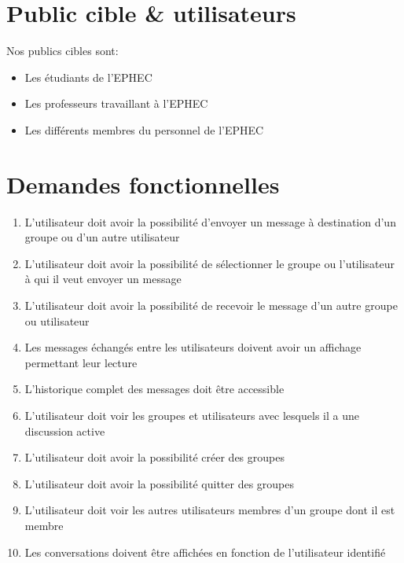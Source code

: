 \documentclass[12pt]{article}
\begin{document}
\section{Public cible \& utilisateurs}

\begin{minipage}{\linewidth}

Nos publics cibles sont:

\begin{itemize}
    \item Les étudiants de l'EPHEC
    \item Les professeurs travaillant à l'EPHEC
    \item Les différents membres du personnel de l'EPHEC
\end{itemize}
\end{minipage}

\section{Demandes fonctionnelles}

\begin{enumerate}
    \item L’utilisateur doit avoir la possibilité d’envoyer un message à destination d’un groupe ou d’un autre utilisateur
    \item L’utilisateur doit avoir la possibilité de sélectionner le groupe ou l’utilisateur à qui il veut envoyer un message
    \item L’utilisateur doit avoir la possibilité de recevoir le message d’un autre groupe ou utilisateur
    \item Les messages échangés entre les utilisateurs doivent avoir un affichage permettant leur lecture
    \item L’historique complet des messages doit être accessible
    \item L’utilisateur doit voir les groupes et utilisateurs avec lesquels il a une discussion active
    \item L’utilisateur doit avoir la possibilité créer des groupes
    \item L’utilisateur doit avoir la possibilité quitter des groupes
    \item L’utilisateur doit voir les autres utilisateurs membres d’un groupe dont il est membre
    \item Les conversations doivent être affichées en fonction de l’utilisateur identifié
\end{enumerate}
\end{document}
